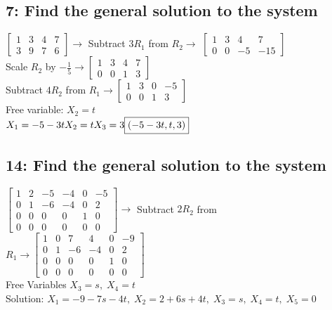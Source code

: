 \documentclass{article}
\begin{document}
\subsection*{7: Find the general solution to the system}
$
\left[\begin{array}{ccc|c}
    1 & 3 & 4 & 7 \\
    3 & 9 & 7 & 6
\end{array}\right]
\rightarrow$ Subtract $3R_1$ from $R_2 \rightarrow$
$
\left[\begin{array}{ccc|c}
    1 & 3 & 4 & 7 \\
    0 & 0 & -5 & -15
\end{array}\right]$ \\[0.1in] Scale $R_2$ by $-\frac{1}{5} \rightarrow
\left[\begin{array}{ccc|c}
    1 & 3 & 4 & 7 \\
    0 & 0 & 1 & 3
\end{array}\right]
$\\[0.1in] Subtract $4R_2$ from $R_1 \rightarrow
\left[\begin{array}{ccc|c}
    1 & 3 & 0 & -5 \\
    0 & 0 & 1 & 3
\end{array}\right]
$ \\[0.1in] Free variable: $X_2 = t$
\\$X_1=-5-3t \\ X_2 = t \\ X_3=3 \\ \boxed{(-5-3t, t, 3)}$ \pagebreak
\subsection*{14: Find the general solution to the system}
$\left[\begin{array}{ccccc|c}
    1 & 2 & -5 & -4 & 0 & -5 \\
    0 & 1 & -6 & -4 & 0 & 2 \\
    0 & 0 & 0 & 0 & 1 & 0 \\
    0 & 0 & 0 & 0 & 0 & 0 
\end{array}\right] \rightarrow$ Subtract $2R_2$ from $R_1 \rightarrow
\left[\begin{array}{ccccc|c}
    1 & 0 & 7 & 4 & 0 & -9 \\
    0 & 1 & -6 & -4 & 0 & 2 \\
    0 & 0 & 0 & 0 & 1 & 0 \\
    0 & 0 & 0 & 0 & 0 & 0 
\end{array}\right]
$ \\[0.1in] Free Variables $X_3 = s, \; X_4=t$
\\Solution: $X_1 = -9-7s-4t, \; X_2 = 2+6s+4t, \; X_3 = s, \; X_4 = t, \; X_5 = 0$
\\[1.2mm]
\end{document}
